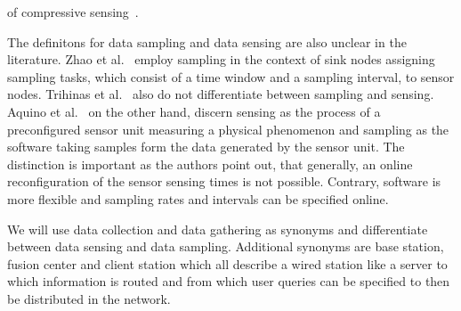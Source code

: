 of compressive sensing~\cite{cheng2013stcdg,luo2009compressive,wang2012data}.
\par
The definitons for data sampling and data sensing are also unclear in the
literature.
Zhao et al.~\cite{zhao2016cats} employ sampling in the context of
sink nodes assigning sampling tasks, which consist of a time window and a
sampling interval, to sensor nodes. Trihinas et al.~\cite{trihinas2015adam}
also do not differentiate between sampling and sensing. Aquino et
al.~\cite{aquino2014musa} on the other hand, discern sensing as the process of
a preconfigured sensor unit measuring a physical phenomenon and sampling as the
software taking samples form the data generated by the sensor unit. The
distinction is important as the authors point out, that generally, an online
reconfiguration of the sensor sensing times is not possible. Contrary, software
is more flexible and sampling rates and intervals can be specified online.
\par
We will use data collection and data gathering as synonyms and differentiate
between data sensing and data sampling.
Additional synonyms are base station,
fusion center and client station which all describe a wired station like a
server to which information is routed and from which user queries can be
specified to then be distributed in the network.

